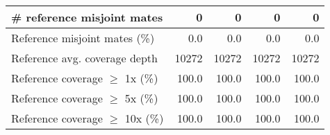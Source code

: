 \documentclass[12pt,a4paper]{article}
\begin{document}
\begin{table}[ht]
\begin{center}
\begin{tabular}{|l*{4}{|r}|}
\# reference misjoint mates & 0 & 0 & 0 & 0 \\ \hline
Reference misjoint mates (\%) & 0.0 & 0.0 & 0.0 & 0.0 \\ \hline
Reference avg. coverage depth & 10272 & 10272 & 10272 & 10272 \\ \hline
Reference coverage $\geq$ 1x (\%) & 100.0 & 100.0 & 100.0 & 100.0 \\ \hline
Reference coverage $\geq$ 5x (\%) & 100.0 & 100.0 & 100.0 & 100.0 \\ \hline
Reference coverage $\geq$ 10x (\%) & 100.0 & 100.0 & 100.0 & 100.0 \\ \hline
\end{tabular}
\end{center}
\end{table}
\end{document}
